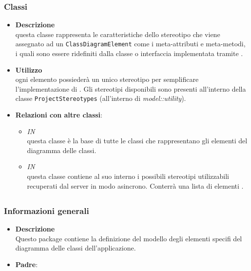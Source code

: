\subsubsection{Classi}
\label{\nogloxy{swedesigner::client::model::celltypes::HxStereotype}}
\begin{itemize}
\item \textbf{Descrizione}\\
questa classe rappresenta le caratteristiche dello stereotipo che viene assegnato ad un \texttt{ClassDiagramElement} come i meta-attributi e meta-metodi, i quali sono essere ridefiniti dalla classe o interfaccia implementata tramite \proj{}. 
\item \textbf{Utilizzo}\\
ogni elemento possiederà un unico stereotipo per semplificare l'implementazione di \proj{}. Gli stereotipi disponibili sono presenti all'interno della classe \texttt{ProjectStereotypes} (all'interno di \emph{model::utility}).
\item \textbf{Relazioni con altre classi}:
\begin{itemize}
\item \textit{IN} \hyperref[\nogloxy{swedesigner::client::model::celltypes::class::ClassDiagramElement}]{}\\
questa classe è la base di tutte le classi che rappresentano gli elementi del diagramma delle classi.
\item \textit{IN} \hyperref[\nogloxy{swedesigner::client::model::utility::ProjectStereotypes}]{}\\
questa classe contiene al suo interno i possibili stereotipi utilizzabili recuperati dal server in modo asincrono. Conterrà una lista di elementi .
\end{itemize}
\end{itemize}
\subsection{}
\label{\nogloxy{swedesigner::client::model::celltypes::activity}}
\subsubsection{Informazioni generali}
\begin{itemize}
\item \textbf{Descrizione}\\
Questo package contiene la definizione del modello degli elementi specifi del diagramma delle classi dell'applicazione.
\item \textbf{Padre}: \hyperref[\nogloxy{swedesigner::client::model::celltypes}]{}
\end{itemize}
